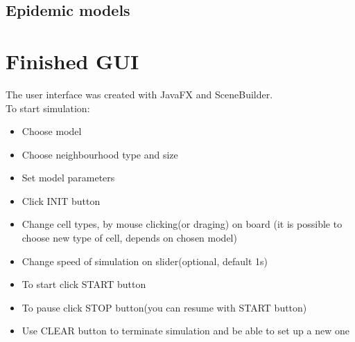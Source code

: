 \documentclass[a4paper, 11pt]{article}
\begin{document}
\subsection{Epidemic models}
\section{Finished GUI}
The user interface was created with JavaFX and SceneBuilder.\\
To start simulation:
\begin{itemize}
\item Choose model
\item Choose neighbourhood type and size
\item Set model parameters
\item Click INIT button
\item Change cell types, by mouse clicking(or draging) on board (it is possible to choose new type of cell, depends on chosen model)
\item Change speed of simulation on slider(optional, default 1s)
\item To start click START button
\item To pause click STOP button(you can resume with START button)
\item Use CLEAR button to terminate simulation and be able to set up a new one

\end{itemize}
\end{document}
